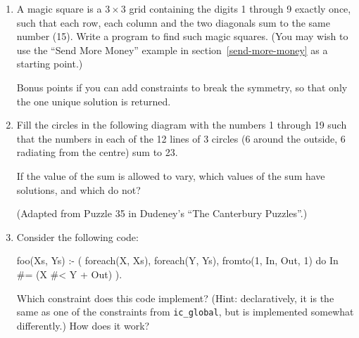 \begin{enumerate}

\item

A magic square is a $3 \times 3$ grid containing the digits 1 through 9
exactly once, such that each row, each column and the two diagonals sum to
the same number (15).  Write a program to find such magic squares.  (You may
wish to use the ``Send More Money'' example in section~\ref{send-more-money}
as a starting point.)

Bonus points if you can add constraints to break the symmetry, so that only
the one unique solution is returned.


\item

Fill the circles in the following diagram with the numbers 1 through 19 such
that the numbers in each of the 12 lines of 3 circles (6 around the outside,
6 radiating from the centre) sum to 23.

\begin{center}
\end{center}

If the value of the sum is allowed to vary, which values of the sum have
solutions, and which do not?

(Adapted from Puzzle 35 in Dudeney's ``The Canterbury Puzzles''.)


\item

Consider the following code:

\begin{code}
foo(Xs, Ys) :-
        (
            foreach(X, Xs),
            foreach(Y, Ys),
            fromto(1, In, Out, 1)
        do
            In #= (X #< Y + Out)
        ).
\end{code}

Which constraint does this code implement?  (Hint: declaratively, it is the
same as one of the constraints from \texttt{ic_global}, but is implemented
somewhat differently.)  How does it work?

\end{enumerate}

